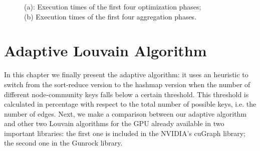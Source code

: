\begin{figure}[t!]
	\caption{(a): Execution times of the first four optimization phases;\\(b) Execution times of the first four aggregation phases.}
\end{figure}
\newpage
\section{Adaptive Louvain Algorithm}
In this chapter we finally present the adaptive algorithm: it uses an heuristic to switch from the sort-reduce version to the hashmap version when the number of different node-community keys falls below a certain threshold. This threshold is calculated in percentage with respect to the total number of possible keys, i.e. the number of edges.
Next, we make a comparison between our adaptive algorithm and other two Louvain algorithms for the GPU already available in two important libraries: the first one is included in the NVIDIA's cuGraph library; the second one in the Gunrock library.
